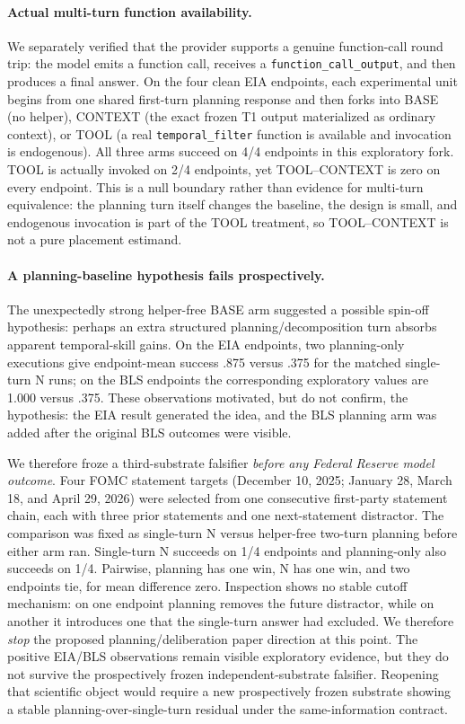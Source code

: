 \paragraph{Actual multi-turn function availability.}
We separately verified that the provider supports a genuine function-call round trip: the model emits a function call, receives a \texttt{function\_call\_output}, and then produces a final answer. On the four clean EIA endpoints, each experimental unit begins from one shared first-turn planning response and then forks into BASE (no helper), CONTEXT (the exact frozen T1 output materialized as ordinary context), or TOOL (a real \texttt{temporal\_filter} function is available and invocation is endogenous). All three arms succeed on 4/4 endpoints in this exploratory fork. TOOL is actually invoked on 2/4 endpoints, yet TOOL--CONTEXT is zero on every endpoint. This is a null boundary rather than evidence for multi-turn equivalence: the planning turn itself changes the baseline, the design is small, and endogenous invocation is part of the TOOL treatment, so TOOL--CONTEXT is not a pure placement estimand.

\paragraph{A planning-baseline hypothesis fails prospectively.}
The unexpectedly strong helper-free BASE arm suggested a possible spin-off hypothesis: perhaps an extra structured planning/decomposition turn absorbs apparent temporal-skill gains. On the EIA endpoints, two planning-only executions give endpoint-mean success .875 versus .375 for the matched single-turn N runs; on the BLS endpoints the corresponding exploratory values are 1.000 versus .375. These observations motivated, but do not confirm, the hypothesis: the EIA result generated the idea, and the BLS planning arm was added after the original BLS outcomes were visible.

We therefore froze a third-substrate falsifier \emph{before any Federal Reserve model outcome}. Four FOMC statement targets (December 10, 2025; January 28, March 18, and April 29, 2026) were selected from one consecutive first-party statement chain, each with three prior statements and one next-statement distractor. The comparison was fixed as single-turn N versus helper-free two-turn planning before either arm ran. Single-turn N succeeds on 1/4 endpoints and planning-only also succeeds on 1/4. Pairwise, planning has one win, N has one win, and two endpoints tie, for mean difference zero. Inspection shows no stable cutoff mechanism: on one endpoint planning removes the future distractor, while on another it introduces one that the single-turn answer had excluded. We therefore \emph{stop} the proposed planning/deliberation paper direction at this point. The positive EIA/BLS observations remain visible exploratory evidence, but they do not survive the prospectively frozen independent-substrate falsifier. Reopening that scientific object would require a new prospectively frozen substrate showing a stable planning-over-single-turn residual under the same-information contract.

